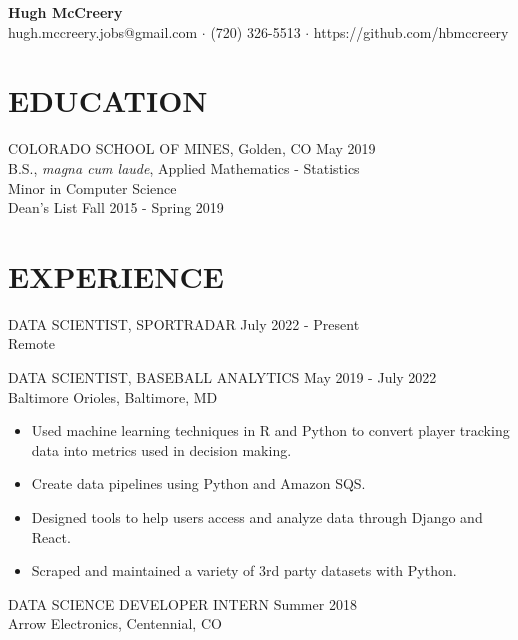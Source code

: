 \documentclass[11pt]{res} %
\begin{document}
 
	\begin{center}
 		\textbf{\LARGE Hugh McCreery} \\
 		hugh.mccreery.jobs@gmail.com $\cdot$ (720) 326-5513 $\cdot$ https://github.com/hbmccreery
	\end{center}
\vspace{-0.6in}
\begin{resume}
\hrulefill
\vspace{-0.2in}                                  
\section{EDUCATION} 
 \noindent COLORADO SCHOOL OF MINES, Golden, CO \hfill May 2019 \\
B.S., \textit{magna cum laude}, Applied Mathematics - Statistics\\
Minor in Computer Science \\
Dean's List \hfill Fall 2015 - Spring 2019 \\
\vspace{-0.1in}
\hrulefill
\vspace{-0.1in}  
\section{EXPERIENCE} 
DATA SCIENTIST, SPORTRADAR \hfill July 2022 - Present \\
Remote

DATA SCIENTIST, BASEBALL ANALYTICS \hfill May 2019  - July 2022	\\
Baltimore Orioles, Baltimore, MD

\begin{itemize}
	\item Used machine learning techniques in R and Python to convert player tracking data into metrics used in decision making.
	\item Create data pipelines using Python and Amazon SQS.
	\item Designed tools to help users access and analyze data through Django and React.
	\item Scraped and maintained a variety of 3rd party datasets with Python.
\end{itemize}
\vspace{-0.15in}  
DATA SCIENCE DEVELOPER INTERN \hfill Summer 2018 \\
Arrow Electronics, Centennial, CO


\end{resume}
\end{document}
